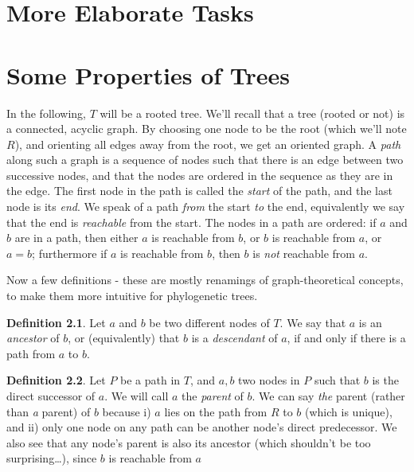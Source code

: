 \documentclass[a4paper,10pt]{report}
\theoremstyle{definition}
\newtheorem{dfn}{Definition}
\begin{document}
\chapter{More Elaborate Tasks}
\label{chap_adv}

\appendix

\chapter{Some Properties of Trees}
\label{sct_defining_clades}

In the following, $T$ will be a rooted tree. We'll recall that a tree (rooted or not) is a connected, acyclic graph. By choosing one node to be the root (which we'll note $R$), and orienting all edges away from the root, we get an oriented graph. A \textit{path} along such a graph is a sequence of nodes such that there is an edge between two successive nodes, and that the nodes are ordered in the sequence as they are in the edge. The first node in the path is called the \textit{start} of the path, and the last node is its \textit{end}. We speak of a path \textit{from} the start \textit{to} the end, equivalently we say that the end is \textit{reachable} from the start. The nodes in a path are ordered: if $a$ and $b$ are in a path, then either $a$ is reachable from $b$, or $b$ is reachable from $a$, or $a = b$; furthermore if $a$ is reachable from $b$, then $b$ is \textit{not} reachable from $a$.

Now a few definitions - these are mostly renamings of graph-theoretical concepts, to make them more intuitive for phylogenetic trees.

\begin{dfn}
\label{def_ancestor}
Let $a$ and $b$ be two different nodes of $T$. We say that $a$ is an \textit{ancestor} of $b$, or (equivalently) that $b$ is a \textit{descendant} of $a$, if and only if there is a path from $a$ to $b$. 
\end{dfn}

\begin{dfn}
\label{def_parent}
Let $P$ be a path in $T$, and $a, b$ two nodes in $P$ such that $b$ is the direct successor of $a$. We will call $a$ the \textit{parent} of $b$. We can say \textit{the} parent (rather than \textit{a} parent) of $b$ because i) $a$ lies on the path from $R$ to $b$ (which is unique), and ii) only one node on any path can be another node's direct predecessor. We also see that any node's parent is also its ancestor (which shouldn't be too surprising\ldots), since $b$ is reachable from $a$
\end{dfn}
\end{document}
